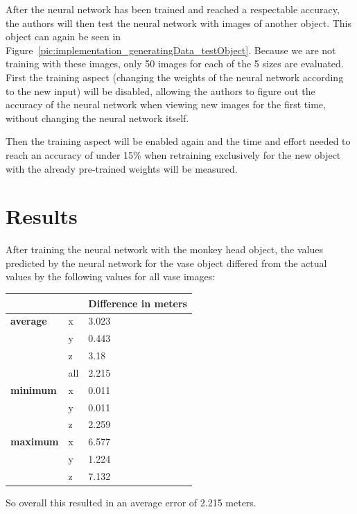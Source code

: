 After the neural network has been trained and reached a respectable accuracy, the authors will then test the neural network with images of another object. This object can again be seen in Figure~\ref{pic:implementation_generatingData_testObject}. Because we are not training with these images, only 50 images for each of the 5 sizes are evaluated. First the training aspect (changing the weights of the neural network according to the new input) will be disabled, allowing the authors to figure out the accuracy of the neural network when viewing new images for the first time, without changing the neural network itself.

Then the training aspect will be enabled again and the time and effort needed to reach an accuracy of under 15\% when retraining exclusively for the new object with the already pre-trained weights will be measured.

\section{Results}
After training the neural network with the monkey head object, the values predicted by the neural network for the vase object differed from the actual values by the following values for all vase images:

\begin{table}[h!]
	\begin{tabular}{ll|l}
		&     & \textbf{Difference in meters} \\
		\hline
		\textbf{average} & x   & 3.023                         \\
		& y   & 0.443                         \\
		& z   & 3.18                          \\
		& all & 2.215                         \\
		\hline
		\textbf{minimum} & x   & 0.011                         \\
		& y   & 0.011                         \\
		& z   & 2.259                         \\
		\hline
		\textbf{maximum} & x   & 6.577                         \\
		& y   & 1.224                         \\
		& z   & 7.132                                                  
	\end{tabular}
\end{table}

So overall this resulted in an average error of 2.215 meters.

